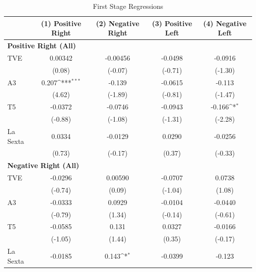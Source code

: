 \documentclass[12pt]{article}
\begin{document}
\begin{table}[htbp]
	\centering
	\scriptsize
	\setlength{\tabcolsep}{4pt}
	\renewcommand{\arraystretch}{0.9}
	\def\sym#1{\ifmmode^{#1}\else\(^{#1}\)\fi}
	\caption{First Stage Regressions}
	\label{tab:first_stage}
	\begin{tabular}{lcccc}
		\hline\hline
		& \multicolumn{1}{c}{(1) Positive Right}
		& \multicolumn{1}{c}{(2) Negative Right}
		& \multicolumn{1}{c}{(3) Positive Left}
		& \multicolumn{1}{c}{(4) Negative Left} \\
		\hline
		\multicolumn{5}{l}{\textbf{Positive Right (All)}}\\
				\hline
		TVE            &  0.00342         & -0.00456         & -0.0498         & -0.0916         \\
		&  (0.08)          & (-0.07)          & (-0.71)         & (-1.30)         \\
		A3             &  0.207\sym{***}  & -0.139           & -0.0615         & -0.113          \\
		&  (4.62)          & (-1.89)          & (-0.81)         & (-1.47)         \\
		T5             & -0.0372          & -0.0746          & -0.0943         & -0.166\sym{*}   \\
		& (-0.88)          & (-1.08)          & (-1.31)         & (-2.28)         \\
		La Sexta       &  0.0334          & -0.0129          &  0.0290         & -0.0256         \\
		&  (0.73)          & (-0.17)          &  (0.37)         & (-0.33)         \\
		\hline
		\multicolumn{5}{l}{\textbf{Negative Right (All)}}\\
				\hline
		TVE            & -0.0296          &  0.00590         & -0.0707         &  0.0738         \\
		& (-0.74)          &  (0.09)          & (-1.04)         &  (1.08)         \\
		A3             & -0.0333          &  0.0929          & -0.0104         & -0.0440         \\
		& (-0.79)          &  (1.34)          & (-0.14)         & (-0.61)         \\
		T5             & -0.0585          &  0.131           &  0.0327         & -0.0166         \\
		& (-1.05)          &  (1.44)          &  (0.35)         & (-0.17)         \\
		La Sexta       & -0.0185          &  0.143\sym{*}    & -0.0399         & -0.123          \\

\end{tabular}
\end{table}
\end{document}
